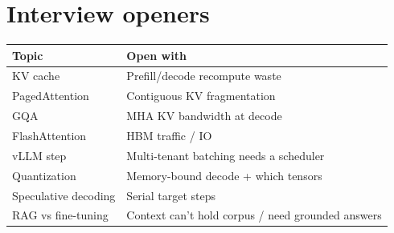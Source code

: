 \documentclass[11pt,a4paper]{article}
\begin{document}
\section{Interview openers}
\begin{table}[ht]
\centering\small
\begin{tabularx}{\textwidth}{@{}lY@{}}
\toprule
\textbf{Topic} & \textbf{Open with} \\
\midrule
KV cache & Prefill/decode recompute waste \\
PagedAttention & Contiguous KV fragmentation \\
GQA & MHA KV bandwidth at decode \\
FlashAttention & HBM traffic / IO \\
vLLM step & Multi-tenant batching needs a scheduler \\
Quantization & Memory-bound decode + which tensors \\
Speculative decoding & Serial target steps \\
RAG vs fine-tuning & Context can't hold corpus / need grounded answers \\
\bottomrule
\end{tabularx}
\end{table}
\end{document}
